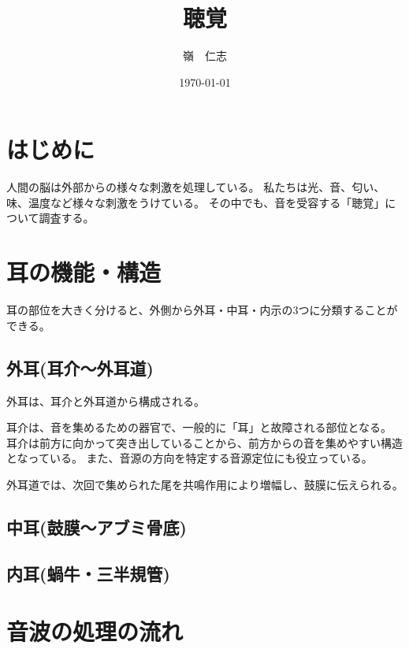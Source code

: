 \documentclass[15pt]{jarticle}
\title{聴覚}
\author{嶺　仁志}
\date{\today}
\begin{document}
\maketitle
\section{はじめに}
\label{intro}
人間の脳は外部からの様々な刺激を処理している。
私たちは光、音、匂い、味、温度など様々な刺激をうけている。
その中でも、音を受容する「聴覚」について調査する。
\section{耳の機能・構造}
\label{ear}
耳の部位を大きく分けると、外側から外耳・中耳・内示の3つに分類することができる。
\subsection{外耳(耳介～外耳道)}
\label{xxx}
外耳は、耳介と外耳道から構成される。

耳介は、音を集めるための器官で、一般的に「耳」と故障される部位となる。
耳介は前方に向かって突き出していることから、前方からの音を集めやすい構造となっている。
また、音源の方向を特定する音源定位にも役立っている。

外耳道では、次回で集められた尾を共鳴作用により増幅し、鼓膜に伝えられる。
\subsection{中耳(鼓膜～アブミ骨底)}
\label{yyy}

\subsection{内耳(蝸牛・三半規管)}
\label{yyy}

\section{音波の処理の流れ}



\end{document}
